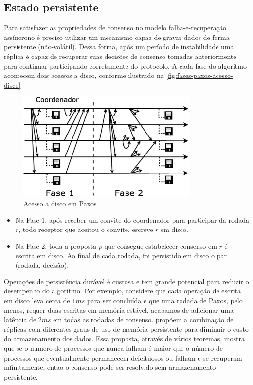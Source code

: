\subsection{Estado persistente}\label{subsec:estado_persistente}

Para satisfazer as propriedades de consenso no modelo falha-e-recuperação assíncrono é
preciso utilizar um mecanismo capaz de gravar dados de forma persistente (não-volátil).
Dessa forma, após um período de instabilidade uma réplica é capaz de recuperar suas
decisões de consenso tomadas anteriormente para continuar participando corretamente do
protocolo. A cada fase do algoritmo acontecem dois acessos a disco, conforme ilustrado na
\autoref{fig:fases-paxos-acesso-disco}

\begin{figure}[htbp]
  \centering
  \includegraphics[width=9cm]{conteudo/capitulos/figuras/fases-paxos-acesso-disco.eps}
  \caption{Acesso a disco em Paxos}
  \label{fig:fases-paxos-acesso-disco}
\end{figure}

\begin{itemize}
  \item Na Fase 1, após receber um convite do coordenador para participar da rodada $r$,
    todo receptor que aceitou o convite, escreve $r$ em disco.
  \item Na Fase 2, toda a proposta $p$ que consegue estabelecer consenso em $r$ é
    escrita em disco. Ao final de cada rodada, foi persistido em disco o par (rodada,
    decisão).
\end{itemize}

Operações de persistência durável é custosa e tem grande potencial para reduzir o
desempenho do algoritmo. Por exemplo, considere que cada operação de escrita em disco leva
cerca de $1ms$ para ser concluída e que uma rodada de Paxos, pelo menos, requer duas
escritas em memória estável, acabamos de adicionar uma latência de $2ms$ em todas as
rodadas de consenso.  propõem a combinação de réplicas com
diferentes graus de uso de memória persistente para diminuir o custo do armazenamento dos
dados. Essa proposta, através de vários teoremas, mostra que se o número de processos que
nunca falham é maior que o número de processos que eventualmente permanecem defeituosos ou
falham e se recuperam infinitamente, então o consenso pode ser resolvido sem armazenamento
persistente.

